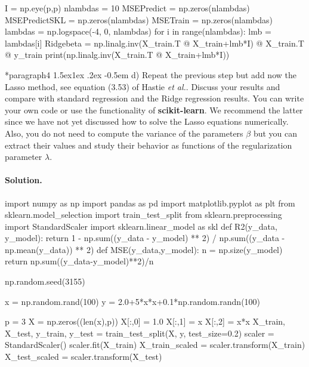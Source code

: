 \documentclass[%
oneside,                 %
final,                   %
10pt]{article}
\makeatletter
\newenvironment{doconceexercise}{}{}
\newcommand\subex{\@startsection*{paragraph}{4}{\z@}%
                  {1.5ex\@plus1ex \@minus.2ex}%
                  {-0.5em}%
                  {\normalfont\normalsize\bfseries}}
\makeatother
\begin{document}
\begin{doconceexercise}
I = np.eye(p,p)
nlambdas = 10
MSEPredict = np.zeros(nlambdas)
MSEPredictSKL = np.zeros(nlambdas)
MSETrain = np.zeros(nlambdas)
lambdas = np.logspace(-4, 0, nlambdas)
for i in range(nlambdas):
    lmb = lambdas[i]
    Ridgebeta = np.linalg.inv(X_train.T @ X_train+lmb*I) @ X_train.T @ y_train
    print(np.linalg.inv(X_train.T @ X_train+lmb*I))


\subex{d)}
Repeat the previous step but add now the Lasso method, see equation (3.53) of Hastie \emph{et al.}. Discuss your results and compare with standard regression and the Ridge regression results. You can write your own code or use the functionality of \textbf{scikit-learn}.  We recommend the latter since we have not yet discussed how to solve the Lasso equations numerically. Also, you do not need to compute the variance of the parameters $\beta$ but you can extract their values and study their behavior as functions of the regularization parameter $\lambda$.

\paragraph{Solution.}
import numpy as np
import pandas as pd
import matplotlib.pyplot as plt
from sklearn.model_selection import train_test_split
from sklearn.preprocessing import StandardScaler
import sklearn.linear_model as skl
def R2(y_data, y_model):
    return 1 - np.sum((y_data - y_model) ** 2) / np.sum((y_data - np.mean(y_data)) ** 2)
def MSE(y_data,y_model):
    n = np.size(y_model)
    return np.sum((y_data-y_model)**2)/n

np.random.seed(3155)

x = np.random.rand(100)
y = 2.0+5*x*x+0.1*np.random.randn(100)

p = 3
X = np.zeros((len(x),p))
X[:,0] = 1.0
X[:,1] = x
X[:,2] = x*x
X_train, X_test, y_train, y_test = train_test_split(X, y, test_size=0.2)
scaler = StandardScaler()
scaler.fit(X_train)
X_train_scaled = scaler.transform(X_train)
X_test_scaled = scaler.transform(X_test)


\end{doconceexercise}
\end{document}
